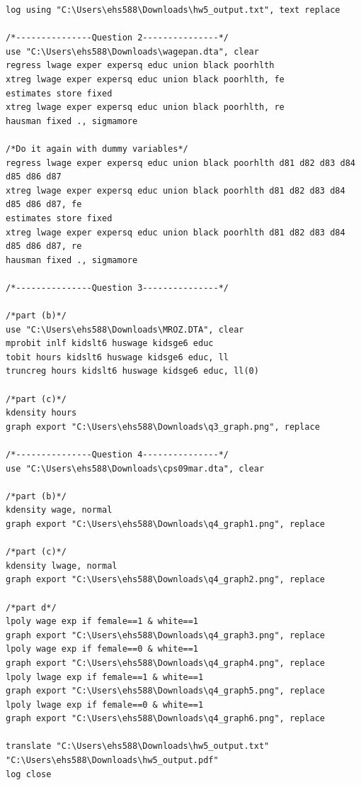 \documentclass{article}
\begin{document}
\begin{lstlisting}
log using "C:\Users\ehs588\Downloads\hw5_output.txt", text replace

/*---------------Question 2---------------*/
use "C:\Users\ehs588\Downloads\wagepan.dta", clear
regress lwage exper expersq educ union black poorhlth
xtreg lwage exper expersq educ union black poorhlth, fe
estimates store fixed
xtreg lwage exper expersq educ union black poorhlth, re
hausman fixed ., sigmamore

/*Do it again with dummy variables*/
regress lwage exper expersq educ union black poorhlth d81 d82 d83 d84 d85 d86 d87
xtreg lwage exper expersq educ union black poorhlth d81 d82 d83 d84 d85 d86 d87, fe
estimates store fixed
xtreg lwage exper expersq educ union black poorhlth d81 d82 d83 d84 d85 d86 d87, re
hausman fixed ., sigmamore

/*---------------Question 3---------------*/

/*part (b)*/
use "C:\Users\ehs588\Downloads\MROZ.DTA", clear
mprobit inlf kidslt6 huswage kidsge6 educ
tobit hours kidslt6 huswage kidsge6 educ, ll
truncreg hours kidslt6 huswage kidsge6 educ, ll(0)

/*part (c)*/
kdensity hours
graph export "C:\Users\ehs588\Downloads\q3_graph.png", replace

/*---------------Question 4---------------*/
use "C:\Users\ehs588\Downloads\cps09mar.dta", clear

/*part (b)*/
kdensity wage, normal
graph export "C:\Users\ehs588\Downloads\q4_graph1.png", replace

/*part (c)*/
kdensity lwage, normal 
graph export "C:\Users\ehs588\Downloads\q4_graph2.png", replace

/*part d*/
lpoly wage exp if female==1 & white==1
graph export "C:\Users\ehs588\Downloads\q4_graph3.png", replace
lpoly wage exp if female==0 & white==1
graph export "C:\Users\ehs588\Downloads\q4_graph4.png", replace
lpoly lwage exp if female==1 & white==1
graph export "C:\Users\ehs588\Downloads\q4_graph5.png", replace
lpoly lwage exp if female==0 & white==1
graph export "C:\Users\ehs588\Downloads\q4_graph6.png", replace

translate "C:\Users\ehs588\Downloads\hw5_output.txt" "C:\Users\ehs588\Downloads\hw5_output.pdf"
log close

\end{lstlisting}
\end{document}
